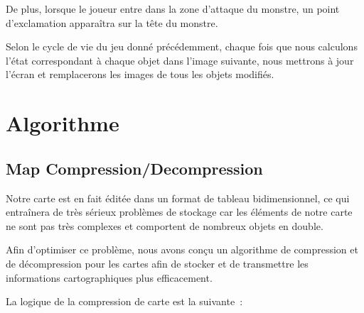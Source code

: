 \documentclass[11pt,english]{article}
\begin{document}
\indent De plus, lorsque le joueur entre dans la zone d'attaque du monstre, un point d'exclamation apparaîtra sur la tête du monstre.

\begin{figure}[H]  
    \centering
\end{figure}

\indent Selon le cycle de vie du jeu donné précédemment, chaque fois que nous calculons l'état correspondant à chaque objet dans l'image suivante, nous mettrons à jour l'écran et remplacerons les images de tous les objets modifiés.

\section{Algorithme}

\subsection{Map Compression/Decompression}

\indent

Notre carte est en fait éditée dans un format de tableau bidimensionnel, ce qui entraînera de très sérieux problèmes de stockage car les éléments de notre carte ne sont pas très complexes et comportent de nombreux objets en double.

\indent Afin d'optimiser ce problème, nous avons conçu un algorithme de compression et de décompression pour les cartes afin de stocker et de transmettre les informations cartographiques plus efficacement.

\indent La logique de la compression de carte est la suivante :
\end{document}
